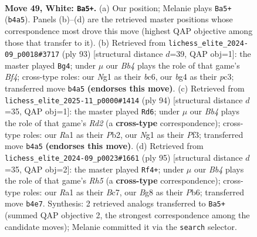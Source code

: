 \documentclass[11pt]{article}
\begin{document}
\clearpage

\begin{figure}[p]\centering
\begin{subfigure}{0.46\textwidth}\centering
\resizebox{\linewidth}{!}{%
\newchessgame
\chessboard[
  setfen={3k2B1/8/7r/8/1B3pbp/PP6/1K6/R5N1 w - - 0 49},
  showmover=false,
  pgfstyle=straightmove, color=movearrow, markmove={b4-a5}
]}
\caption{}
\end{subfigure}\hfill
\begin{subfigure}{0.46\textwidth}\centering
\resizebox{\linewidth}{!}{%
\newchessgame
\chessboard[
  setfen={1R6/5pk1/2B3p1/4Pb2/8/2P1K3/7p/8 b - - 0 47},
  showmover=false,
  pgfstyle=straightmove, color=movearrow, markmove={f5-g4}
]}
\caption{}
\end{subfigure}
\\[4pt]
\begin{subfigure}{0.46\textwidth}\centering
\resizebox{\linewidth}{!}{%
\newchessgame
\chessboard[
  setfen={8/1r5k/4n2p/1p3p2/1B6/5PK1/1P1R2P1/8 w - - 0 48},
  showmover=false,
  pgfstyle=straightmove, color=movearrow, markmove={d2-d6}
]}
\caption{}
\end{subfigure}\hfill
\begin{subfigure}{0.46\textwidth}\centering
\resizebox{\linewidth}{!}{%
\newchessgame
\chessboard[
  setfen={R7/2b3p1/1pk5/5K1p/1p5r/8/P7/8 b - - 3 48},
  showmover=false,
  pgfstyle=straightmove, color=movearrow, markmove={h4-f4}
]}
\caption{}
\end{subfigure}
\caption{\textbf{Move 49, White: \texttt{Ba5+}.} (a) Our position; Melanie plays \texttt{Ba5+} (\texttt{b4a5}). Panels (b)--(d) are the retrieved master positions whose correspondence most drove this move (highest QAP objective among those that transfer to it). (b) Retrieved from \texttt{lichess\_elite\_2024-09\_p0018\#3717} (ply 93) [structural distance $d$=39, QAP obj=1]: the master played \texttt{Bg4}; under $\mu$ our \emph{Bb4} plays the role of that game's \emph{Bf4}; cross-type roles: our \emph{N}g1 as their \emph{b}c6, our \emph{b}g4 as their \emph{p}c3; transferred move \texttt{b4a5} \textbf{(endorses this move)}. (c) Retrieved from \texttt{lichess\_elite\_2025-11\_p0000\#1414} (ply 94) [structural distance $d$=35, QAP obj=1]: the master played \texttt{Rd6}; under $\mu$ our \emph{Bb4} plays the role of that game's \emph{Rd2} (a \textbf{cross-type} correspondence); cross-type roles: our \emph{R}a1 as their \emph{P}b2, our \emph{N}g1 as their \emph{P}f3; transferred move \texttt{b4a5} \textbf{(endorses this move)}. (d) Retrieved from \texttt{lichess\_elite\_2024-09\_p0023\#1661} (ply 95) [structural distance $d$=35, QAP obj=2]: the master played \texttt{Rf4+}; under $\mu$ our \emph{Bb4} plays the role of that game's \emph{Rh5} (a \textbf{cross-type} correspondence); cross-type roles: our \emph{R}a1 as their \emph{B}c7, our \emph{B}g8 as their \emph{P}b6; transferred move \texttt{b4e7}. Synthesis: 2 retrieved analogs transferred to \texttt{Ba5+} (summed QAP objective 2, the strongest correspondence among the candidate moves); Melanie committed it via the \texttt{search} selector.}
\label{fig:thought-m96}
\end{figure}
\end{document}
